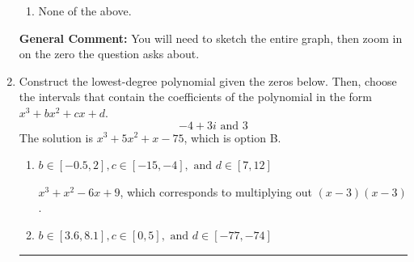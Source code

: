 \documentclass{extbook}[14pt]
\newcommand{\litem}[1]{\item #1

\rule{\textwidth}{0.4pt}}
\begin{document}
\begin{enumerate}
{\begin{enumerate}[label=\Alph*.]
\item None of the above.\end{enumerate}
\textbf{General Comment:} You will need to sketch the entire graph, then zoom in on the zero the question asks about.
}
\litem{
Construct the lowest-degree polynomial given the zeros below. Then, choose the intervals that contain the coefficients of the polynomial in the form $x^3+bx^2+cx+d$.
\[ -4 + 3 i \text{ and } 3 \]The solution is \( x^{3} +5 x^{2} +x -75 \), which is option B.\begin{enumerate}[label=\Alph*.]
\item \( b \in [-0.5, 2], c \in [-15, -4], \text{ and } d \in [7, 12] \)

$x^{3} + x^{2} -6 x + 9$, which corresponds to multiplying out $(x -3)(x -3)$.
\item \( b \in [3.6, 8.1], c \in [0, 5], \text{ and } d \in [-77, -74] \)


\end{enumerate}}
\end{enumerate}
\end{document}
